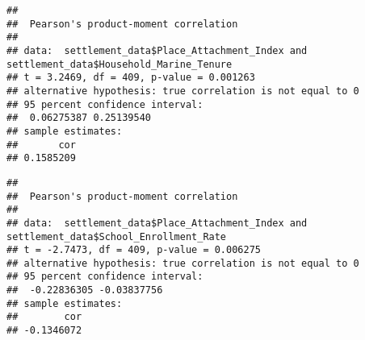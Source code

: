\documentclass[
]{article}
\newenvironment{Shaded}{\begin{snugshade}}{\end{snugshade}}
\newcommand{\AttributeTok}[1]{\textcolor[rgb]{0.13,0.29,0.53}{#1}}
\newcommand{\CommentTok}[1]{\textcolor[rgb]{0.56,0.35,0.01}{\textit{#1}}}
\newcommand{\FunctionTok}[1]{\textcolor[rgb]{0.13,0.29,0.53}{\textbf{#1}}}
\newcommand{\NormalTok}[1]{#1}
\newcommand{\SpecialCharTok}[1]{\textcolor[rgb]{0.81,0.36,0.00}{\textbf{#1}}}
\newcommand{\StringTok}[1]{\textcolor[rgb]{0.31,0.60,0.02}{#1}}
\begin{document}
\begin{Shaded}
\end{Shaded}

\begin{verbatim}
## 
##  Pearson's product-moment correlation
## 
## data:  settlement_data$Place_Attachment_Index and settlement_data$Household_Marine_Tenure
## t = 3.2469, df = 409, p-value = 0.001263
## alternative hypothesis: true correlation is not equal to 0
## 95 percent confidence interval:
##  0.06275387 0.25139540
## sample estimates:
##       cor 
## 0.1585209
\end{verbatim}

\begin{Shaded}
\end{Shaded}

\begin{verbatim}
## 
##  Pearson's product-moment correlation
## 
## data:  settlement_data$Place_Attachment_Index and settlement_data$School_Enrollment_Rate
## t = -2.7473, df = 409, p-value = 0.006275
## alternative hypothesis: true correlation is not equal to 0
## 95 percent confidence interval:
##  -0.22836305 -0.03837756
## sample estimates:
##        cor 
## -0.1346072
\end{verbatim}

\begin{Shaded}
\end{Shaded}
\end{document}
